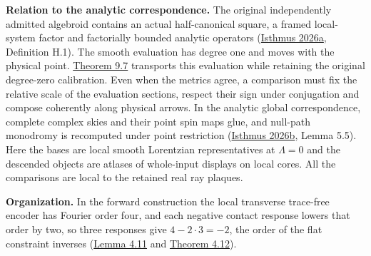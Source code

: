 \documentclass[
  english,
  11pt,
  reqno]{amsart}
\makeatletter
\newcommand{\paperleadspace}{%
  \par\if@nobreak\else
    \addpenalty{\@secpenalty}\addvspace{.5\baselineskip}%
  \fi}
\newcommand{\paperleadin}[1]{%
  \ifvmode\paperleadspace\fi
  \textbf{#1}}
\makeatother
\begin{document}
\paperleadin{Relation to the analytic correspondence.} The original
independently admitted algebroid contains an actual half-canonical
square, a framed local-system factor and factorially bounded analytic
operators (\hyperref[ref-IsthmusLocal2026]{Isthmus 2026a}, Definition
H.1). The smooth evaluation has degree one and moves with the physical
point. \hyperref[thm:analytic-structured-wave-comparison]{Theorem 9.7}
transports this evaluation while retaining the original degree-zero
calibration. Even when the metrics agree, a comparison must fix the
relative scale of the evaluation sections, respect their sign under
conjugation and compose coherently along physical arrows. In the
analytic global correspondence, complete complex skies and their point
spin maps glue, and null-path monodromy is recomputed under point
restriction (\hyperref[ref-IsthmusGlobal2026]{Isthmus 2026b}, Lemma
5.5). Here the bases are local smooth Lorentzian representatives at
\(\Lambda=0\) and the descended objects are atlases of whole-input
displays on local cores. All the comparisons are local to the retained
real ray plaques.

\paperleadin{Organization.} In the forward construction the local transverse
trace-free encoder has Fourier order four, and each negative contact
response lowers that order by two, so three responses give
\(4-2\cdot3=-2\), the order of the flat constraint inverses
(\hyperref[lem:online-negative-response-intermediate-orders]{Lemma 4.11}
and \hyperref[thm:online-negative-response-flat-green]{Theorem 4.12}).
\end{document}

